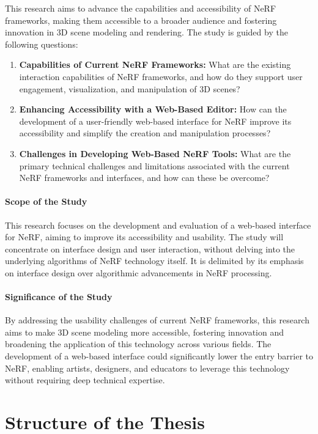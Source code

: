 This research aims to advance the capabilities and accessibility of NeRF frameworks, making them accessible to a broader audience and fostering innovation in 3D scene modeling and rendering. The study is guided by the following questions:

\begin{enumerate}
    \item \textbf{Capabilities of Current NeRF Frameworks:} What are the existing interaction capabilities of NeRF frameworks, and how do they support user engagement, visualization, and manipulation of 3D scenes?

    \item \textbf{Enhancing Accessibility with a Web-Based Editor:} How can the development of a user-friendly web-based interface for NeRF improve its accessibility and simplify the creation and manipulation processes?

    \item \textbf{Challenges in Developing Web-Based NeRF Tools:} What are the primary technical challenges and limitations associated with the current NeRF frameworks and interfaces, and how can these be overcome?
\end{enumerate}

\paragraph{Scope of the Study}
This research focuses on the development and evaluation of a web-based interface for NeRF, aiming to improve its accessibility and usability. 
The study will concentrate on interface design and user interaction, without delving into the underlying algorithms of NeRF technology itself. 
It is delimited by its emphasis on interface design over algorithmic advancements in NeRF processing.

\paragraph{Significance of the Study}
By addressing the usability challenges of current NeRF frameworks, this research aims to make 3D scene modeling more accessible, fostering innovation and broadening the application of this technology across various fields. 
The development of a web-based interface could significantly lower the entry barrier to NeRF, enabling artists, designers, and educators to leverage this technology without requiring deep technical expertise.

\section{Structure of the Thesis}
\label{sec:intro:structure}

